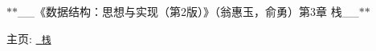 $\ast$$\ast$\+\_\+\+\_\+《数据结构：思想与实现（第2版）》（翁惠玉，俞勇）第3章 栈\+\_\+\+\_\+$\ast$$\ast$

主页\+: \href{https://grwei.github.io/data-structure-homework/DS_Ch3/doc/html/index.html}{\texttt{ 栈}} 